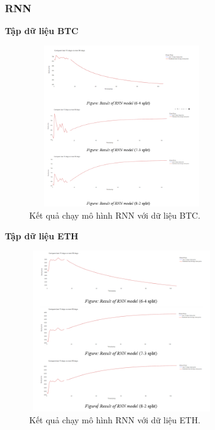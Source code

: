 \documentclass[conference]{IEEEtran}
\begin{document}
\subsubsection{RNN} \textbf{Tập dữ liệu BTC}
\begin{figure}[H] %
    \centering
    \includegraphics[width=8cm, height=7cm]{Images/RNN-BTC.png} %
    \caption{Kết quả chạy mô hình RNN với dữ liệu BTC.}
    \label{fig:arima-model}
\end{figure}

\textbf{Tập dữ liệu ETH}
\begin{figure}[H] %
    \centering
    \includegraphics[width=8cm, height=7cm]{Images/RNN-ETH.png} %
    \caption{Kết quả chạy mô hình RNN với dữ liệu ETH.}
    \label{fig:arima-model}
\end{figure}
\end{document}
